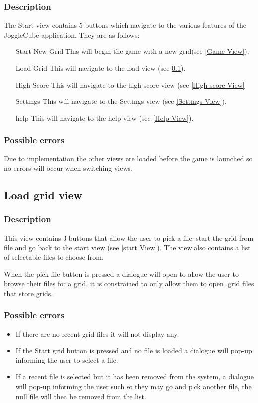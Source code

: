 \documentclass{project}
\begin{document}
\subsubsection{Description}
The Start view contains 5 buttons which navigate to the various features of the JoggleCube application. They are as follows:
\begin{itemize}
\item[Start New Grid] This will begin the game with a new grid(see \ref{Game View}).
\item[Load Grid] This will navigate to the load view (see \ref{Load View}).
\item[High Score] This will navigate to the high score view (see \ref{High score View}
\item[Settings] This will navigate to the Settings view (see \ref{Settings View}).
\item[help] This will navigate to the help view (see \ref{Help View}).
\end{itemize} 
\subsubsection{Possible errors}
Due to implementation the other views are loaded before the game is launched so no errors will occur when switching views.

\subsection{Load grid view} \label{Load View}
\subsubsection{Description}
This view contains 3 buttons that allow the user to pick a file, start the grid from file and go back to the start view (see \ref{start View}). The view also contains a list of selectable files to choose from.

When the pick file button is pressed a dialogue will open to allow the user to browse their files for a grid, it is constrained to only allow them to open .grid files that store grids.
\subsubsection{Possible errors}
\begin{itemize}
\item If there are no recent grid files it will not display any.
\item If the Start grid button is pressed and no file is loaded a dialogue will pop-up informing the user to select a file.
\item If a recent file is selected but it has been removed from the system, a dialogue will pop-up informing the user such so they may go and pick another file, the null file will then be removed from the list.
\end{itemize}
\end{document}
